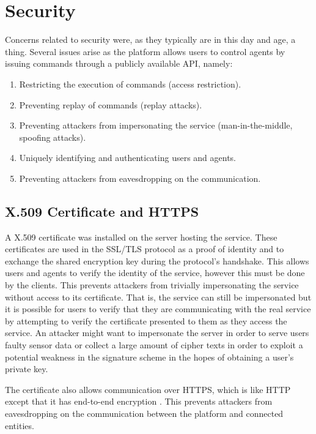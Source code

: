\section{Security}
\label{sec:security}
Concerns related to security were, as they typically are in this day and age, a thing.
Several issues arise as the platform allows users to control agents by issuing commands through a publicly available API, namely:

\begin{enumerate}
	\item Restricting the execution of commands (access restriction).
	\item Preventing replay of commands (replay attacks).
	\item Preventing attackers from impersonating the service (man-in-the-middle, spoofing attacks).
	\item Uniquely identifying and authenticating users and agents.
	\item Preventing attackers from eavesdropping on the communication.
\end{enumerate}

\subsection{X.509 Certificate and HTTPS}
A X.509 certificate \citep[section 3.1]{rfca} was installed on the server hosting the service.
These certificates are used in the SSL/TLS protocol as a proof of identity and to exchange the shared encryption key during the protocol's handshake.
This allows users and agents to verify the identity of the service, however this must be done by the clients.
This prevents attackers from trivially impersonating the service without access to its certificate.
That is, the service can still be impersonated but it is possible for users to verify that they are communicating with the real service by attempting to verify the certificate presented to them as they access the service.
An attacker might want to impersonate the server in order to serve users faulty sensor data or collect a large amount of cipher texts in order to exploit a potential weakness in the signature scheme in the hopes of obtaining a user's private key.

The certificate also allows communication over HTTPS, which is like HTTP except that it has end-to-end encryption \citep{rfc-https}.
This prevents attackers from eavesdropping on the communication between the platform and connected entities.

